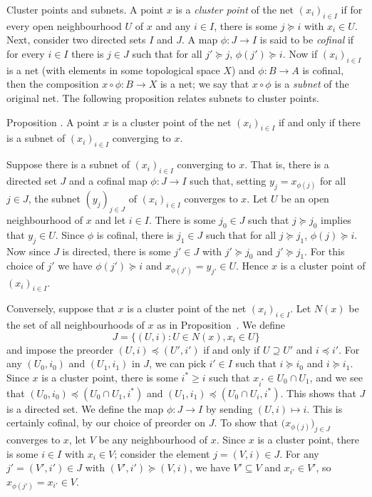\medskip\boldlabel Cluster points and subnets.
A point $x$ is a {\it cluster point} of the net $(x_i)_{i\in I}$ if for every open neighbourhood $U$
of $x$ and any $i\in I$, there is some $j\succeq i$ with $x_i\in U$. Next, consider two directed sets
$I$ and $J$. A map $\phi:J\to I$ is said to be {\it cofinal} if for every $i\in I$ there is $j\in J$
such that for all $j'\succeq j$, $\phi(j') \succeq i$. Now if $(x_i)_{i\in I}$ is a net (with elements
in some topological space $X$) and $\phi:B\to A$ is
cofinal, then the composition $x\circ \phi : B\to X$ is a net; we say that $x\circ \phi$ is
a {\it subnet} of the original net.
The following proposition relates subnets to cluster points.

\proclaim Proposition \advthm.
A point $x$ is a cluster point of the net $(x_i)_{i\in I}$ if and only if there is a subnet
of $(x_i)_{i\in I}$ converging to $x$.

\proof Suppose there is a subnet of $(x_i)_{i\in I}$ converging to $x$. That is, there is a directed
set $J$ and a cofinal map $\phi : J\to I$ such that, setting $y_j = x_{\phi(j)}$ for all $j\in J$,
the subnet $(y_j)_{j\in J}$ of $(x_i)_{i\in I}$ converges to $x$. Let $U$ be an open neighbourhood
of $x$ and let $i\in I$. There is some $j_0\in J$ such that $j\succeq j_0$ implies that $y_j\in U$.
Since $\phi$ is cofinal, there is $j_1\in J$ such that for all $j\succeq j_1$, $\phi(j)\succeq i$.
Now since $J$ is directed, there is some $j'\in J$ with $j'\succeq j_0$ and $j'\succeq j_1$.
For this choice of $j'$ we have $\phi(j')\succeq i$ and $x_{\phi(j')} = y_{j'} \in U$. Hence $x$
is a cluster point of $(x_i)_{i\in I}$.

Conversely, suppose that $x$ is a cluster point of the net $(x_i)_{i\in I}$. Let $N(x)$
be the set of all neighbourhoods of $x$ as in Proposition~{\propnbhdnet}. We define
$$J = \bigl\{ (U, i) : U\in N(x), x_i\in U\bigr\}$$
and impose the preorder $(U,i) \preceq (U', i')$ if and only if $U\supseteq U'$ and $i\preceq i'$.
For any $(U_0, i_0)$ and $(U_1, i_1)$ in $J$, we can pick $i'\in I$ such that $i\succeq i_0$
and $i\succeq i_1$. Since $x$ is a cluster point, there is some $i^*\ge i$ such that
$x_{i^*}\in U_0\cap U_1$, and we see that $(U_0, i_0) \preceq (U_0\cap U_1, i^*)$
and $(U_1, i_1)\preceq (U_0 \cap U_i, i^*)$. This shows that $J$ is a directed set. We define
the map $\phi : J\to I$ by sending $(U,i)\mapsto i$. This is certainly cofinal, by our choice of preorder
on $J$. To show that $\bigl(x_{\phi(j)}\bigr)_{j\in J}$ converges to $x$, let $V$ be any neighbourhood
of $x$. Since $x$ is a cluster point, there is some $i\in I$ with $x_i\in V$; consider the
element $j = (V, i)\in J$. For any $j' = (V', i') \in J$ with $(V', i')\succeq (V,i)$, we have
$V' \subseteq V$ and $x_{i'}\in V'$, so $x_{\phi(j')} = x_{i'}\in V$.\slug

